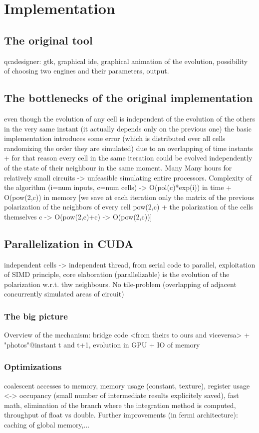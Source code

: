 \section{Implementation}\label{sec:i}
\subsection {The original tool}
qcadesigner: gtk, graphical ide, graphical animation of the evolution, possibility of choosing two engines and their parameters, output.
\subsection {The bottlenecks of the original implementation}
even though the evolution of any cell is independent of the evolution of the others  in the very same instant  (it actually depends only on the previous one) the basic implementation introduces some error (which is distributed over all cells randomizing the order they are simulated) due to an overlapping of time instants + for that reason every cell in the same iteration could be evolved  independently  of the state of their neighbour in the same moment. Many Many hours for relatively small circuits -> unfeasible simulating entire processors. Complexity of the algorithm (i=num inputs, c=num cells) -> O(pol(c)*exp(i)) in time + O(pow(2,c)) in memory [we save at each iteration only the matrix of the previous polarization of the neighbors of every cell {pow(2,c)} + the polarization of the cells themselves {c} -> O(pow(2,c)+c) -> O(pow(2,c))]
\subsection {Parallelization in CUDA}
independent cells -> independent thread, from serial code to parallel, exploitation of SIMD principle, core elaboration (parallelizable) is the evolution of the polarization w.r.t. thw neighbours. No tile-problem (overlapping of adjacent concurrently simulated areas of circuit)
\subsubsection{The big picture}
Overview of the mechanism: bridge code <from theirs to ours and viceversa> + "photos"@instant t and t+1, evolution in GPU + IO of memory
\subsubsection{Optimizations}
coalescent accesses to memory, memory usage (constant, texture), register usage <-> occupancy (small number of intermediate results explicitely saved), fast math, elimination of the branch where the integration method is computed, throughput of float vs double. Further improvements (in fermi architecture): caching of global memory,...
